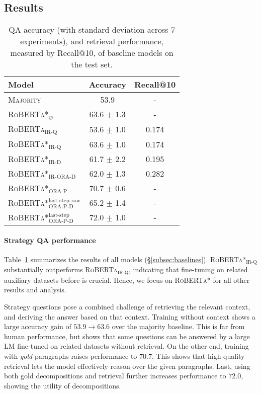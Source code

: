 {\subsection{Results}
\label{subsection:experiment_results}

\begin{table}[t]
    \centering
    \footnotesize
    \begin{tabular}{l|cc}
      Model & Accuracy & Recall@10 \\ \toprule
      \textsc{Majority} & 53.9 & - \\
      \textsc{RoBERTa*$_\varnothing$} & 63.6 $\pm$ 1.3 & - \\
      \textsc{RoBERTa$_{\text{IR-Q}}$} & 53.6 $\pm$ 1.0 & 0.174 \\
      \textsc{RoBERTa*$_{\text{IR-Q}}$} & 63.6 $\pm$ 1.0 & 0.174  \\
      \textsc{RoBERTa*$_{\text{IR-D}}$} & 61.7 $\pm$ 2.2 & 0.195 \\  \hline \hline
      \textsc{RoBERTa*$_{\text{IR-ORA-D}}$} & 62.0 $\pm$ 1.3 & 0.282 \\
      \textsc{RoBERTa*$_{\text{ORA-P}}$} & 70.7 $\pm$ 0.6 & - \\
       \textsc{RoBERTa*}$^{\text{last-step-raw}}_\text{ORA-P-D}$ & 65.2 $\pm$ 1.4 & -\\
       \textsc{RoBERTa*}$^{\text{last-step}}_\text{ORA-P-D}$ & 72.0 $\pm$ 1.0 & -\\
    \end{tabular}
    \caption{QA accuracy (with standard deviation across 7 experiments), and retrieval performance, measured by Recall@10, of baseline models on the test set.}
    \label{table:baseline_results}
\end{table}

\paragraph{Strategy QA performance}
Table~\ref{table:baseline_results} summarizes the results of all models (\S\ref{subsec:baselines}). \textsc{RoBERTa*$_{\text{IR-Q}}$} substantially outperforms \textsc{RoBERTa$_{\text{IR-Q}}$}, indicating that fine-tuning on related auxiliary datasets before \strategyqa{} is crucial. Hence, we focus on \textsc{RoBERTa*} for all other results and analysis.

Strategy questions pose a combined challenge of retrieving the relevant context, and deriving the answer based on that context. Training without context shows a large accuracy gain of $53.9 \rightarrow 63.6$ over the majority baseline. This is far from human performance, but shows that some questions can be answered by a large LM fine-tuned on related datasets without retrieval.
On the other end, training with \emph{gold} paragraphs raises performance to $70.7$. This shows that high-quality retrieval lets the model effectively reason over the given paragraphs. Last, using both gold decompositions and retrieval further increases performance to $72.0$, showing the utility of decompositions. 

}
